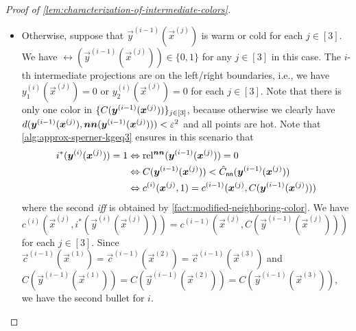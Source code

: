 \begin{proof}[Proof of \cref{lem:characterization-of-intermediate-colors}]
\begin{itemize}[itemsep=0.2em,topsep=0.5em]
        Since they are in a region that is at most bichromatic, 
        the color set $\{C(\vec{y}^{(i-1)}(\vec{x}^{(j)})), \hat{C}_{\sf nn}(\vec{y}^{(i-1)}(\vec{x}^{(j)}))\}$ is then the same across all $j\in [3]$.
        Since $\vec{c}^{(i-1)}(\vec{x}^{(1)})=\vec{c}^{(i-1)}(\vec{x}^{(2)})=\vec{c}^{(i-1)}(\vec{x}^{(3)})$, we then have the same $\vec{c}^{(i)}(\vec{x}^{(j)})$ across all $j\in [3]$, which gives the first bullet of this lemma. 
        \item Otherwise, suppose that $\vec{y}^{(i-1)}(\vec{x}^{(j)})$ is warm or cold for each $j\in [3]$. We have $\rel(\vec{y}^{(i-1)}(\vec{x}^{(j)}))\in \{0,1\}$ for any $j\in [3]$ in this case.
        The $i$-th intermediate projections are on the left/right boundaries, i.e., we have $y_1^{(i)}(\vec{x}^{(j)})=0$ or $y_2^{(i)}(\vec{x}^{(j)})=0$ for each $j\in [3]$.
        Note that there is only one color in $\{{C(\boldsymbol{y}^{(i-1)}(\boldsymbol{x}^{(j)}))} \}_{j\in [3]}$, because otherwise we clearly have $d(\boldsymbol{y}^{(i-1)}(\boldsymbol{x}^{(j)}),\operatorname*{\boldsymbol{nn}}(\boldsymbol{y}^{(i-1)}(\boldsymbol{x}^{(j)})))<\varepsilon^2$ and all points are hot. 
        Note that \cref{alg:approx-sperner-kgeq3} ensures in this scenario that 
        \begin{align*}
            i^*(\boldsymbol{y}^{(i)}(\boldsymbol{x}^{(j)}))=1 
            &\Leftrightarrow 
            \operatorname*{rel^{\boldsymbol{nn}}}(\boldsymbol{y}^{(i-1)}(\boldsymbol{x}^{(j)}))=0\\
            &\Leftrightarrow
            C(\boldsymbol{y}^{(i-1)}(\boldsymbol{x}^{(j)}))<\hat{C}_{\sf nn}(\boldsymbol{y}^{(i-1)}(\boldsymbol{x}^{(j)}))\\
            &\Leftrightarrow
            c^{(i)}(\boldsymbol{x}^{(j)},1) = c^{(i-1)}(\boldsymbol{x}^{(j)}, C(\boldsymbol{y}^{(i-1)}(\boldsymbol{x}^{(j)})))
        \end{align*}
        where the second {\em iff} is obtained by \cref{fact:modified-neighboring-color}.
        We have $c^{(i)}(\vec{x}^{(j)}, i^*(\vec{y}^{(i)}(\vec{x}^{(j)}))) = c^{(i-1)}(\vec{x}^{(j)}, C(\vec{y}^{(i-1)}(\vec{x}^{(j)})))$ for each $j\in [3]$.
        Since $\vec{c}^{(i-1)}(\vec{x}^{(1)})=\vec{c}^{(i-1)}(\vec{x}^{(2)})=\vec{c}^{(i-1)}(\vec{x}^{(3)})$ and $C(\vec{y}^{(i-1)}(\vec{x}^{(1)}))=C(\vec{y}^{(i-1)}(\vec{x}^{(2)}))=C(\vec{y}^{(i-1)}(\vec{x}^{(3)}))$, 
        we have the second bullet for $i$.
    \end{itemize}


\end{proof}

